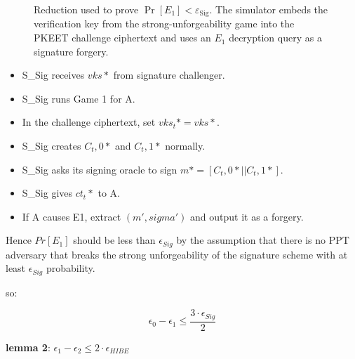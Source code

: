 \documentclass[
]{article}
\providecommand{\tightlist}{%
  \setlength{\itemsep}{0pt}\setlength{\parskip}{0pt}}
\begin{document}
\begin{figure}[ht]

\caption{
Reduction used to prove
$\Pr[E_1]<\varepsilon_{\mathrm{Sig}}$.
The simulator embeds the verification key from the
strong-unforgeability game into the PKEET challenge ciphertext
and uses an $E_1$ decryption query as a signature forgery.
}
\label{fig:E1-reduction}

\end{figure}


\begin{itemize}
\tightlist
\item
  S\_Sig receives \(vks*\) from signature challenger.
\item
  S\_Sig runs Game 1 for A.
\item
  In the challenge ciphertext, set \(vks_t* = vks*\).
\item
  S\_Sig creates \(C_t,0*\) and \(C_t,1*\) normally.
\item
  S\_Sig asks its signing oracle to sign \(m*=[C_t,0*||C_t,1*]\).
\item
  S\_Sig gives \(ct_t*\) to A.
\item
  If A causes E1, extract \((m', sigma')\) and output it as a forgery.
\end{itemize}

Hence \(Pr[E_1]\) should be less than \(\epsilon_{Sig}\) by the
assumption that there is no PPT adversary that breaks the strong
unforgeability of the signature scheme with at least \(\epsilon_{Sig}\)
probability.

so:

\[
\epsilon_0 - \epsilon_1 \leq \frac{3\cdot \epsilon_{Sig}}{2}
\]

\textbf{lemma 2}:
\(\epsilon_1 - \epsilon_2 \leq 2\cdot \epsilon_{HIBE}\)
\end{document}
